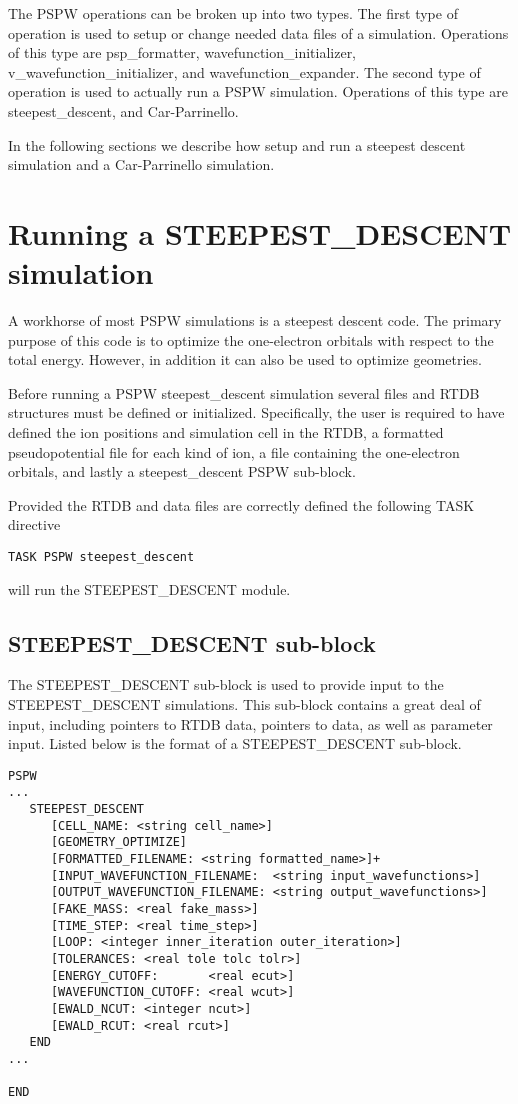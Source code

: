 The PSPW operations can be broken up into two types.  The first type of 
operation is used to setup or change needed data files of a simulation.  
Operations of this type are psp\_formatter, wavefunction\_initializer, 
v\_wavefunction\_initializer, and wavefunction\_expander.  The second type 
of operation is used to actually run a PSPW simulation.  Operations of this 
type are steepest\_descent, and Car-Parrinello.

In the following sections we describe how setup and run a steepest descent
simulation and a Car-Parrinello simulation.


\section{Running a STEEPEST\_DESCENT simulation} 

A workhorse of most PSPW simulations is a steepest descent code.  
The primary purpose of this code is to optimize the one-electron
orbitals with respect to the total energy.  However, in addition it
can also be used to optimize geometries. 

Before running a PSPW steepest\_descent simulation several files and
RTDB structures must be defined or initialized.  Specifically, the user 
is required to have defined the ion positions and simulation cell in the 
RTDB, a formatted pseudopotential file for each kind of ion, 
a file containing the one-electron orbitals, and lastly a 
steepest\_descent PSPW sub-block. 

Provided the RTDB and data files are correctly defined
the following TASK directive
\begin{verbatim}
TASK PSPW steepest_descent 
\end{verbatim}
will run the STEEPEST\_DESCENT module.


\subsection{STEEPEST\_DESCENT  sub-block}
The STEEPEST\_DESCENT sub-block is used to provide input to the
STEEPEST\_DESCENT simulations.  This sub-block contains a great deal
of input, including pointers to RTDB data, pointers to data, as well as
parameter input.  Listed below is the format of a STEEPEST\_DESCENT sub-block.
\begin{verbatim}
PSPW
...
   STEEPEST_DESCENT
      [CELL_NAME: <string cell_name>]
      [GEOMETRY_OPTIMIZE]
      [FORMATTED_FILENAME: <string formatted_name>]+
      [INPUT_WAVEFUNCTION_FILENAME:  <string input_wavefunctions>]
      [OUTPUT_WAVEFUNCTION_FILENAME: <string output_wavefunctions>]
      [FAKE_MASS: <real fake_mass>]
      [TIME_STEP: <real time_step>]
      [LOOP: <integer inner_iteration outer_iteration>]
      [TOLERANCES: <real tole tolc tolr>]
      [ENERGY_CUTOFF:       <real ecut>]
      [WAVEFUNCTION_CUTOFF: <real wcut>]
      [EWALD_NCUT: <integer ncut>]
      [EWALD_RCUT: <real rcut>]
   END
...

END
\end{verbatim}

